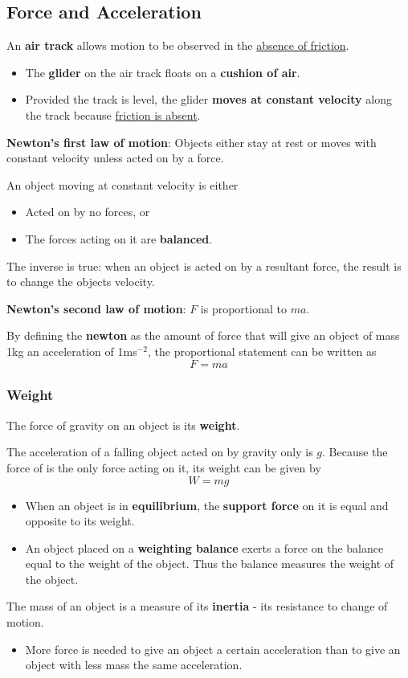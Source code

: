 \subsection{Force and Acceleration}

An \textbf{air track} allows motion to be observed in the \underline{absence of friction}.
\begin{itemize}
    \item The \textbf{glider} on the air track floats on a \textbf{cushion of air}.
    \item Provided the track is level, the glider \textbf{moves at constant velocity} along the track because \underline{friction is absent}.
\end{itemize}

\textbf{Newton's first law of motion}: Objects either stay at rest or moves with constant velocity unless acted on by a force.

An object moving at constant velocity is either
\begin{itemize}
    \item Acted on by no forces, or
    \item The forces acting on it are \textbf{balanced}.
\end{itemize}

The inverse is true: when an object is acted on by a resultant force, the result is to change the objects velocity.

\textbf{Newton's second law of motion}: $F$ is proportional to $ma$.

By defining the \textbf{newton} as the amount of force that will give an object of mass 1kg an acceleration of 1ms$^{-2}$, the proportional statement can be written as
$$F=ma$$

\subsubsection*{Weight}

The force of gravity on an object is its \textbf{weight}.

The acceleration of a falling object acted on by gravity only is $g$. Because the force of is the only force acting on it, its weight can be given by
$$W=mg$$

\begin{itemize}
    \item When an object is in \textbf{equilibrium}, the \textbf{support force} on it is equal and opposite to its weight.
    \item An object placed on a \textbf{weighting balance} exerts a force on the balance equal to the weight of the object. Thus the balance measures the weight of the object.
\end{itemize}

The mass of an object is a measure of its \textbf{inertia} - its resistance to change of motion.
\begin{itemize}
    \item More force is needed to give an object a certain acceleration than to give an object with less mass the same acceleration.
\end{itemize}

